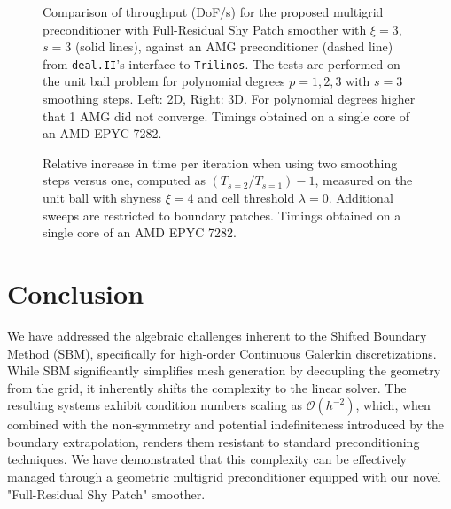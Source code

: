 \documentclass{elsarticle}
\begin{document}
\begin{figure}[htbp]
    \centering
    
    \caption{Comparison of throughput (DoF/s) for the proposed multigrid preconditioner with Full-Residual Shy Patch smoother with  $\xi=3$, $s=3$ (solid lines), against
        an AMG preconditioner (dashed line) from \texttt{deal.II}'s interface to \texttt{Trilinos}. The tests are performed on the unit ball problem for polynomial degrees $p=1,2,3$ with $s=3$ smoothing steps. Left: 2D, Right: 3D.
        For polynomial degrees higher that 1 AMG did not converge. Timings obtained on a single core of an AMD EPYC 7282. }
    \label{fig:timing_solver}

\end{figure}

\begin{figure}[htbp]
    \centering
    
    \caption{Relative increase in time per iteration when using two smoothing steps versus one, computed as $(T_{s=2}/T_{s=1})-1$, measured on the unit ball with shyness $\xi=4$ and cell threshold $\lambda=0$. Additional sweeps are restricted to boundary patches. Timings obtained on a single core of an AMD EPYC 7282.}
    \label{fig:timing_sweeps}
\end{figure}

\section{Conclusion}
\label{sec:conclusion}

We have addressed the algebraic challenges inherent to the Shifted Boundary Method (SBM), specifically for high-order
Continuous Galerkin discretizations. While SBM significantly simplifies mesh generation by decoupling the geometry from
the grid, it inherently shifts the complexity to the linear solver. The resulting systems exhibit condition numbers
scaling as $\mathcal{O}(h^{-2})$, which, when combined with the non-symmetry and potential indefiniteness introduced by
the boundary extrapolation, renders them resistant to standard preconditioning techniques. We have demonstrated that
this complexity can be effectively managed through a geometric multigrid preconditioner equipped with our novel
"Full-Residual Shy Patch" smoother.
\end{document}

